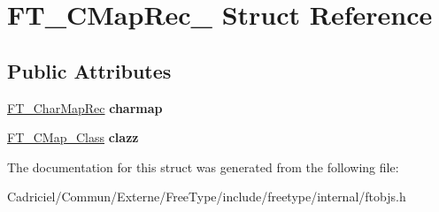 \hypertarget{struct_f_t___c_map_rec__}{}\section{F\+T\+\_\+\+C\+Map\+Rec\+\_\+ Struct Reference}
\label{struct_f_t___c_map_rec__}
\subsection*{Public Attributes}
\begin{DoxyCompactItemize}
\item 
\hyperlink{struct_f_t___char_map_rec__}{F\+T\+\_\+\+Char\+Map\+Rec} {\bfseries charmap}\hypertarget{struct_f_t___c_map_rec___a39fa6de9995d4ae4496b93e2b874b34e}{}\label{struct_f_t___c_map_rec___a39fa6de9995d4ae4496b93e2b874b34e}

\item 
\hyperlink{struct_f_t___c_map___class_rec__}{F\+T\+\_\+\+C\+Map\+\_\+\+Class} {\bfseries clazz}\hypertarget{struct_f_t___c_map_rec___aa85db42650df0edb38f8af5887c0ac6a}{}\label{struct_f_t___c_map_rec___aa85db42650df0edb38f8af5887c0ac6a}

\end{DoxyCompactItemize}


The documentation for this struct was generated from the following file\+:\begin{DoxyCompactItemize}
\item 
Cadriciel/\+Commun/\+Externe/\+Free\+Type/include/freetype/internal/ftobjs.\+h\end{DoxyCompactItemize}
